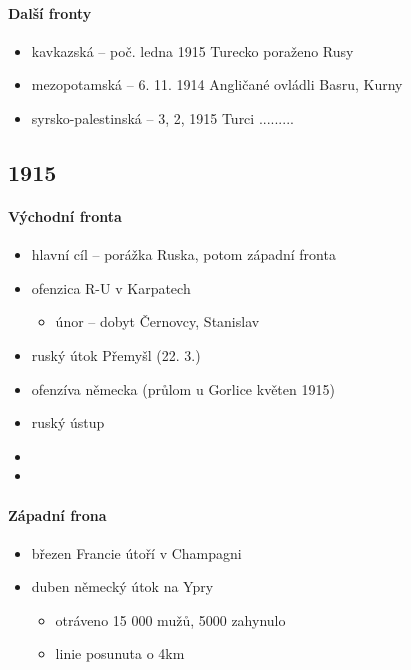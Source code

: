 \paragraph{Další fronty}
\begin{itemize}
\item kavkazská -- poč. ledna 1915 Turecko poraženo Rusy
\item mezopotamská -- 6. 11. 1914 Angličané ovládli Basru, Kurny
\item syrsko-palestinská -- 3, 2, 1915 Turci .........
\end{itemize}


\subsection{1915}
\paragraph{Východní fronta}
\begin{itemize}
\item hlavní cíl -- porážka Ruska, potom západní fronta
\item ofenzica R-U v Karpatech
	\begin{itemize}
	\item únor -- dobyt Černovcy, Stanislav
	\end{itemize}
\item ruský útok \ra Přemyšl (22. 3.)
\item ofenzíva německa (průlom u Gorlice květen 1915)
\item ruský ústup
\item
\item 
\end{itemize}

\paragraph{Západní frona}
\begin{itemize}
\item březen Francie útoří v Champagni
\item duben německý útok na Ypry
	\begin{itemize}
	\item otráveno 15 000 mužů, 5000 zahynulo
	\item linie posunuta o 4km
	\end{itemize}
\end{itemize}

